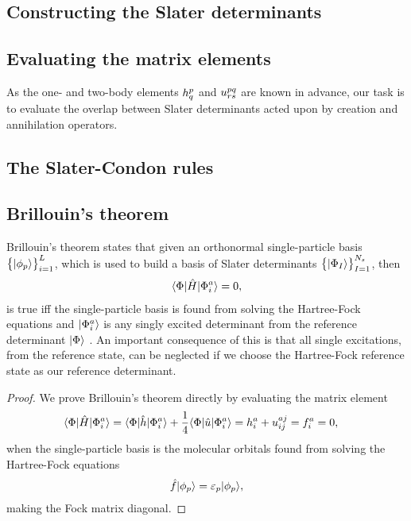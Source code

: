         \subsection{Constructing the Slater determinants}

        \subsection{Evaluating the matrix elements}
            As the one- and two-body elements $h^{p}_{q}$ and
            $u^{pq}_{rs}$ are known in advance, our task is to evaluate
            the overlap between Slater determinants acted upon by creation and
            annihilation operators.

        \subsection{The Slater-Condon rules}

        \subsection{Brillouin's theorem}
            Brillouin's theorem states that given an orthonormal single-particle
            basis $\left\{ | \phi_p \rangle \right\}_{i = 1}^{L}$, which is used to build a basis of
            Slater determinants $\left\{ | \Phi_I \rangle \right\}_{I = 1}^{N_s}$, then
            \begin{align}
                \langle \Phi |\hat{H}| \Phi^{a}_{i} \rangle = 0,
            \end{align}
            is true iff the single-particle basis is found from solving the
            Hartree-Fock equations and $| \Phi^{a}_{i} \rangle$ is any singly
            excited determinant from the reference determinant $| \Phi \rangle$
            \cite{kvaal2017notes}.
            An important consequence of this is that all single excitations,
            from the reference state, can be neglected if we choose the
            Hartree-Fock reference state as our reference determinant.
            \begin{proof}
                We prove Brillouin's theorem directly by evaluating the matrix
                element
                \begin{align}
                    \langle \Phi |\hat{H}| \Phi^{a}_{i} \rangle
                    &= \langle \Phi |\hat{h}| \Phi^{a}_{i} \rangle
                    + \frac{1}{4}\langle \Phi |\hat{u}| \Phi^{a}_{i} \rangle
                    = h^{a}_{i} + u^{aj}_{ij}
                    = f^{a}_{i} = 0,
                \end{align}
                when the single-particle basis is the molecular orbitals found
                from solving the Hartree-Fock equations
                \begin{align}
                    \hat{f}| \phi_p \rangle = \varepsilon_p| \phi_p \rangle,
                \end{align}
                making the Fock matrix diagonal.
            \end{proof}

